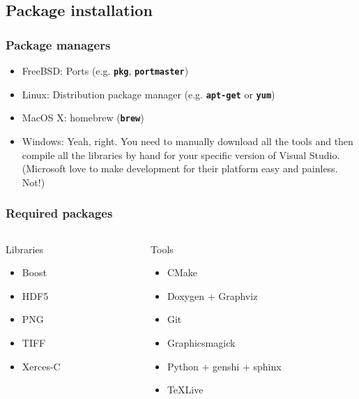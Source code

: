 \documentclass{beamer}
\newcommand{\cmd}[1]{\textbf{\texttt{#1}}}
\begin{document}
\subsection{Package installation}
\begin{frame}
  \frametitle{Package managers}
  \begin{itemize}
  \item FreeBSD: Ports (e.g. \cmd{pkg}, \cmd{portmaster})
  \item Linux: Distribution package manager (e.g. \cmd{apt-get} or \cmd{yum})
  \item MacOS X: homebrew (\cmd{brew})
  \item Windows: Yeah, right.  You need to manually download all the
    tools and then compile all the libraries by hand for your specific
    version of Visual Studio.  (Microsoft love to make development for
    their platform easy and painless.  Not!)
  \end{itemize}
\end{frame}

\begin{frame}
  \frametitle{Required packages}
  \begin{columns}
    \begin{column}{.5\linewidth}
      \begin{block}{Libraries}
        \begin{itemize}
        \item[] Boost
        \item[] HDF5
        \item[] PNG
        \item[] TIFF
        \item[] Xerces-C
        \end{itemize}
      \end{block}
    \end{column}
    \begin{column}{.5\linewidth}
      \begin{block}{Tools}
        \begin{itemize}
        \item[] CMake
        \item[] Doxygen + Graphviz
        \item[] Git
        \item[] Graphicsmagick
        \item[] Python + genshi + sphinx
        \item[] \TeX{}Live
        \end{itemize}
      \end{block}
    \end{column}
  \end{columns}
\end{frame}
\end{document}
